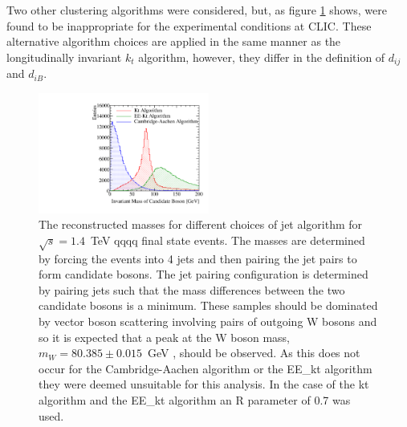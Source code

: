 \noindent Two other clustering algorithms were considered, but, as figure \ref{fig:invariantmassalgoveto} shows, were found to be inappropriate for the experimental conditions at CLIC.  These alternative algorithm choices are applied in the same manner as the longitudinally invariant $k_{t}$ algorithm, however, they differ in the definition of $d_{ij}$ and $d_{iB}$.

\begin{figure}[h!]
\centering
\includegraphics[width=0.5\textwidth]{PhysicsAnalysis/Plots/SimpleInvMassPlot/InvariantMassesAlgorithmVeto.pdf}
\caption[The reconstructed masses for different choices of jet algorithm for $\sqrt{s}=1.4$~TeV \nu{\nu}qqqq final state events.  The masses are determined by forcing the events into 4 jets and then pairing the jet pairs to form candidate bosons.  The jet pairing configuration is determined by pairing jets such that the mass differences between the two candidate bosons is a minimum.  These samples should be dominated by vector boson scattering involving pairs of outgoing W bosons and so it is expected that a peak at the W boson mass, $m_{W} = 80.385 \pm 0.015$~GeV \cite{Beringer:1900zz}, should be observed.  As this does not occur for the Cambridge-Aachen algorithm or the EE\_kt algorithm they were deemed unsuitable for this analysis. In the case of the kt algorithm and the EE\_kt algorithm an R parameter of 0.7 was used.]{The reconstructed masses for different choices of jet algorithm for $\sqrt{s}=1.4$~TeV \nu{\nu}qqqq final state events.  The masses are determined by forcing the events into 4 jets and then pairing the jet pairs to form candidate bosons.  The jet pairing configuration is determined by pairing jets such that the mass differences between the two candidate bosons is a minimum.  These samples should be dominated by vector boson scattering involving pairs of outgoing W bosons and so it is expected that a peak at the W boson mass, $m_{W} = 80.385 \pm 0.015$~GeV \cite{Beringer:1900zz}, should be observed.  As this does not occur for the Cambridge-Aachen algorithm or the EE\_kt algorithm they were deemed unsuitable for this analysis. In the case of the kt algorithm and the EE\_kt algorithm an R parameter of 0.7 was used.}
\label{fig:invariantmassalgoveto}
\end{figure}

